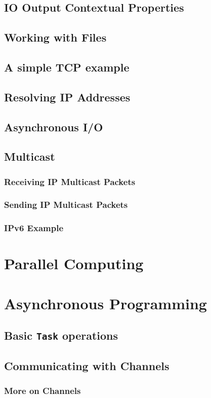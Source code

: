     \section{IO Output Contextual Properties}
    \section{Working with Files}
    \section{A simple TCP example}
    \section{Resolving IP Addresses}
    \section{Asynchronous I/O}
    \section{Multicast}
    \subsection{Receiving IP Multicast Packets}
    \subsection{Sending IP Multicast Packets}
    \subsection{IPv6 Example}
  \chapter{Parallel Computing}
  \chapter{Asynchronous Programming}
    \section{Basic \texttt{Task} operations}
    \section{Communicating with Channels}
    \subsection{More on Channels}
